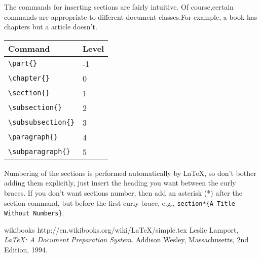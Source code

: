 \documentclass{article}
\begin{document}
The commands for inserting sections are fairly intuitive. Of course,certain commands are
appropriate to different document classes.For example, a book has chapters but a article doesn't.
\begin{center}
  \begin{tabular}{|l|l|}
    \hline
    Command & Level \\ \hline
    \verb|\part{}| & -1 \\
    \verb|\chapter{} | & 0 \\
    \verb|\section{} | & 1 \\
    \verb|\subsection{}| & 2 \\
    \verb|\subsubsection{}| & 3 \\
    \verb|\paragraph{}| & 4 \\
    \verb|\subparagraph{}| & 5 \\
    \hline
  \end{tabular}
\end{center}
Numbering of the sections is performed automatically by \LaTeX{}, so don't bother adding
them explicitly, just insert the heading you want between the curly braces.  If you don't
want sections number, then add an asterisk (*) after the section command, but before the
first curly brace, e.g., \verb|section*{A Title Without Numbers}|.
\begin{thebibliography}{99}
  wikibooks
  http://en.wikibooks.org/wiki/LaTeX/simple.tex
  Leslie Lamport,
  \emph{\LaTeX: A Document Preparation System}.
  Addison Wesley, Massachusetts,
  2nd Edition,
  1994.
\end{thebibliography}
\end{document}
